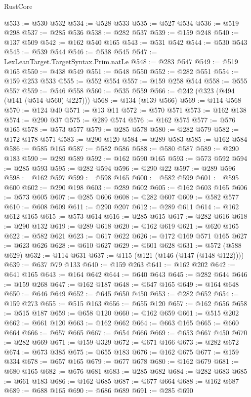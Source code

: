 \begin{lexlean}{RustCore}
\begin{coremodule}
@533 := @530 @532
@534 := @528 @533
@535 := @527 @534
@536 := @519 @298
@537 := @285 @536
@538 := @282 @537
@539 := @159 @248
@540 := @137 @509
@542 := @162 @540 @165
@543 := @531 @542
@544 := @530 @543
@545 := @539 @544
@546 := @538 @545
@547 := LexLeanTarget.TargetSyntax.Prim.natLe
@548 := @283 @547
@549 := @519 @165
@550 := @438 @549
@551 := @548 @550
@552 := @282 @551
@554 := @159 @253 @533
@555 := @552 @554
@557 := @159 @258 @544
@558 := @555 @557
@559 := @546 @558
@560 := @535 @559
@566 := @242 (@323 (@494 (@141 (@514 @560) @227)))
@568 := @134 (@139 @566)
@569 := @114 @568
@570 := @124 @40
@571 := @13 @11
@572 := @570 @571
@573 := @162 @138
@574 := @290 @37
@575 := @289 @574
@576 := @162 @575
@577 := @576 @165
@578 := @573 @577
@579 := @285 @578
@580 := @282 @579
@582 := @172 @178 @571
@583 := @290 @120
@584 := @289 @583
@585 := @162 @584
@586 := @585 @165
@587 := @582 @586
@588 := @580 @587
@589 := @290 @183
@590 := @289 @589
@592 := @162 @590 @165
@593 := @573 @592
@594 := @285 @593
@595 := @282 @594
@596 := @290 @22
@597 := @289 @596
@598 := @162 @597
@599 := @598 @165
@600 := @582 @599
@601 := @595 @600
@602 := @290 @198
@603 := @289 @602
@605 := @162 @603 @165
@606 := @573 @605
@607 := @285 @606
@608 := @282 @607
@609 := @582 @577
@610 := @608 @609
@611 := @290 @207
@612 := @289 @611
@614 := @162 @612 @165
@615 := @573 @614
@616 := @285 @615
@617 := @282 @616
@618 := @290 @132
@619 := @289 @618
@620 := @162 @619
@621 := @620 @165
@622 := @582 @621
@623 := @617 @622
@626 := @172 @169 @571 @165
@627 := @623 @626
@628 := @610 @627
@629 := @601 @628
@631 := @572 (@588 @629)
@632 := @114 @631
@637 := @115 (@121 (@146 (@147 (@148 @122))))
@639 := @637 @79 @133
@640 := @159 @263
@641 := @162 @202
@642 := @641 @165
@643 := @164 @642
@644 := @640 @643
@645 := @282 @644
@646 := @159 @268
@647 := @162 @187
@648 := @647 @165
@649 := @164 @648
@650 := @646 @649
@652 := @645 @650 @450
@653 := @282 @652
@654 := @159 @273
@655 := @515 @163
@656 := @655 @120
@657 := @162 @656
@658 := @515 @187
@659 := @658 @120
@660 := @162 @659
@661 := @515 @202
@662 := @661 @120
@663 := @162 @662
@664 := @663 @165
@665 := @660 @664
@666 := @657 @665
@667 := @654 @666
@669 := @653 @667 @450
@670 := @282 @669
@671 := @159 @329
@672 := @671 @166
@673 := @282 @672
@674 := @673 @385
@675 := @655 @183
@676 := @162 @675
@677 := @159 @334
@678 := @657 @165
@679 := @677 @678
@680 := @162 @679
@681 := @680 @165
@682 := @676 @681
@683 := @285 @682
@684 := @282 @683
@685 := @661 @183
@686 := @162 @685
@687 := @677 @664
@688 := @162 @687
@689 := @688 @165
@690 := @686 @689
@691 := @285 @690

\end{coremodule}
\end{lexlean}
